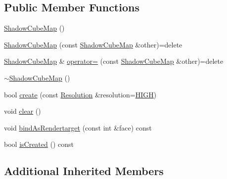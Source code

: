 \subsection*{Public Member Functions}
\begin{DoxyCompactItemize}
\item 
\hyperlink{classburn_1_1_shadow_cube_map_a599b548269fabfd0ee97e1d5ce9f38a9}{Shadow\-Cube\-Map} ()
\item 
\hyperlink{classburn_1_1_shadow_cube_map_a3d9ddc7204cdc28972e34607c323858a}{Shadow\-Cube\-Map} (const \hyperlink{classburn_1_1_shadow_cube_map}{Shadow\-Cube\-Map} \&other)=delete
\item 
\hyperlink{classburn_1_1_shadow_cube_map}{Shadow\-Cube\-Map} \& \hyperlink{classburn_1_1_shadow_cube_map_ad6121442fd4c9e91ec80b1c1f49241ef}{operator=} (const \hyperlink{classburn_1_1_shadow_cube_map}{Shadow\-Cube\-Map} \&other)=delete
\item 
\hyperlink{classburn_1_1_shadow_cube_map_ae42dcafba18ff6617621fec719d9bd7f}{$\sim$\-Shadow\-Cube\-Map} ()
\item 
bool \hyperlink{classburn_1_1_shadow_cube_map_adfed32062083f0a6ee604afd737141ed}{create} (const \hyperlink{classburn_1_1_shadow_cube_map_a199f4c817b2cadb4f3b93c270c4f209e}{Resolution} \&resolution=\hyperlink{classburn_1_1_shadow_cube_map_a199f4c817b2cadb4f3b93c270c4f209eadec66121357f641252b33af54af06eab}{H\-I\-G\-H})
\item 
void \hyperlink{classburn_1_1_shadow_cube_map_a20303d8a205cf66cb5b9e979fb868c88}{clear} ()
\item 
void \hyperlink{classburn_1_1_shadow_cube_map_a410af6be57e69747cbdc7c4fbe05873b}{bind\-As\-Rendertarget} (const int \&face) const 
\item 
bool \hyperlink{classburn_1_1_shadow_cube_map_a284df2f4e4f5440e5290208aa59a0c68}{is\-Created} () const 
\end{DoxyCompactItemize}
\subsection*{Additional Inherited Members}


